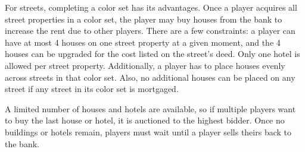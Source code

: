 For streets, completing a color set has its advantages. Once a player acquires all street properties in a color set, the player may buy houses from the bank to increase the rent due to other players. There are a few constraints: a player can have at most 4 houses on one street property at a given moment, and the 4 houses can be upgraded for the cost listed on the street’s deed. Only one hotel is allowed per street property. Additionally, a player has to place houses evenly across streets in that color set. Also, no additional houses can be placed on any street if any street in its color set is mortgaged.

A limited number of houses and hotels are available, so if multiple players want to buy the last house or hotel, it is auctioned to the highest bidder. Once no buildings or hotels remain, players must wait until a player sells theirs back to the bank.